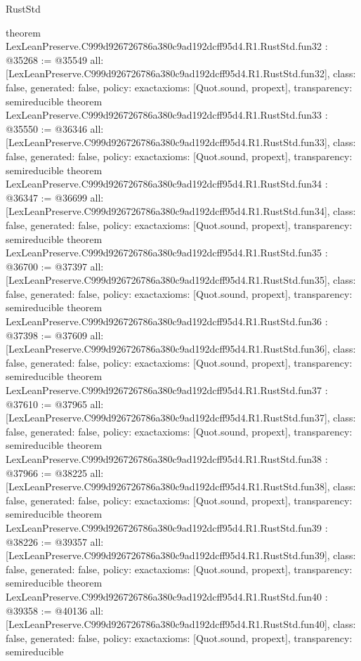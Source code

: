 \begin{lexlean}{RustStd}
\begin{coremodule}
{}
theorem LexLeanPreserve.C999d926726786a380c9ad192dcff95d4.R1.RustStd.fun32 : @35268 := @35549 {
  all: [LexLeanPreserve.C999d926726786a380c9ad192dcff95d4.R1.RustStd.fun32],
  class: false,
  generated: false,
  policy: exact{axioms: [Quot.sound, propext]},
  transparency: semireducible
}
theorem LexLeanPreserve.C999d926726786a380c9ad192dcff95d4.R1.RustStd.fun33 : @35550 := @36346 {
  all: [LexLeanPreserve.C999d926726786a380c9ad192dcff95d4.R1.RustStd.fun33],
  class: false,
  generated: false,
  policy: exact{axioms: [Quot.sound, propext]},
  transparency: semireducible
}
theorem LexLeanPreserve.C999d926726786a380c9ad192dcff95d4.R1.RustStd.fun34 : @36347 := @36699 {
  all: [LexLeanPreserve.C999d926726786a380c9ad192dcff95d4.R1.RustStd.fun34],
  class: false,
  generated: false,
  policy: exact{axioms: [Quot.sound, propext]},
  transparency: semireducible
}
theorem LexLeanPreserve.C999d926726786a380c9ad192dcff95d4.R1.RustStd.fun35 : @36700 := @37397 {
  all: [LexLeanPreserve.C999d926726786a380c9ad192dcff95d4.R1.RustStd.fun35],
  class: false,
  generated: false,
  policy: exact{axioms: [Quot.sound, propext]},
  transparency: semireducible
}
theorem LexLeanPreserve.C999d926726786a380c9ad192dcff95d4.R1.RustStd.fun36 : @37398 := @37609 {
  all: [LexLeanPreserve.C999d926726786a380c9ad192dcff95d4.R1.RustStd.fun36],
  class: false,
  generated: false,
  policy: exact{axioms: [Quot.sound, propext]},
  transparency: semireducible
}
theorem LexLeanPreserve.C999d926726786a380c9ad192dcff95d4.R1.RustStd.fun37 : @37610 := @37965 {
  all: [LexLeanPreserve.C999d926726786a380c9ad192dcff95d4.R1.RustStd.fun37],
  class: false,
  generated: false,
  policy: exact{axioms: [Quot.sound, propext]},
  transparency: semireducible
}
theorem LexLeanPreserve.C999d926726786a380c9ad192dcff95d4.R1.RustStd.fun38 : @37966 := @38225 {
  all: [LexLeanPreserve.C999d926726786a380c9ad192dcff95d4.R1.RustStd.fun38],
  class: false,
  generated: false,
  policy: exact{axioms: [Quot.sound, propext]},
  transparency: semireducible
}
theorem LexLeanPreserve.C999d926726786a380c9ad192dcff95d4.R1.RustStd.fun39 : @38226 := @39357 {
  all: [LexLeanPreserve.C999d926726786a380c9ad192dcff95d4.R1.RustStd.fun39],
  class: false,
  generated: false,
  policy: exact{axioms: [Quot.sound, propext]},
  transparency: semireducible
}
theorem LexLeanPreserve.C999d926726786a380c9ad192dcff95d4.R1.RustStd.fun40 : @39358 := @40136 {
  all: [LexLeanPreserve.C999d926726786a380c9ad192dcff95d4.R1.RustStd.fun40],
  class: false,
  generated: false,
  policy: exact{axioms: [Quot.sound, propext]},
  transparency: semireducible
}
\end{coremodule}
\end{lexlean}
